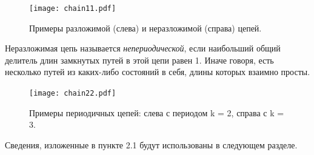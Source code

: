 \documentclass[14pt,a4paper]{article}
\begin{document}
\begin{figure}[H]
    \centering
    \texttt{[image: chain11.pdf]}
    \caption{Примеры разложимой (слева) и неразложимой (справа) цепей.}
    \label{fig:my_label}
\end{figure}

 Неразложимая цепь называется \textit{непериодической}, если наибольший общий делитель длин замкнутых путей в этой цепи равен 1. Иначе говоря, есть несколько путей из каких-либо состояний в себя, длины которых взаимно просты.

\begin{figure}[H]
    \centering
    \texttt{[image: chain22.pdf]}    \caption{Примеры периодичных цепей: слева с периодом k = 2, справа с k = 3.}
    \label{fig:my_label}
\end{figure}
Сведения, изложенные в пункте 2.1 будут использованы в следующем разделе. 



\newpage
\end{document}
